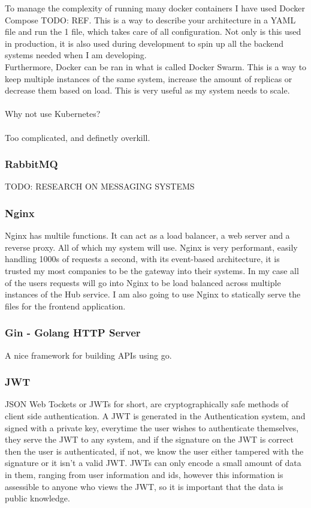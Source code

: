 \documentclass[titlepage]{article}
\begin{document}
To manage the complexity of running many docker containers I have used Docker Compose TODO: REF. This is a way to describe your architecture in a YAML file and run the 1 file, which takes care of all configuration. Not only is this used in production, it is also used during development to spin up all the backend systems needed when I am developing. \\

Furthermore, Docker can be ran in what is called Docker Swarm. This is a way to keep multiple instances of the same system, increase the amount of replicas or decrease them based on load. This is very useful as my system needs to scale. \\

\\
\noindent
{\large Why not use Kubernetes?} \\
\\
Too complicated, and definetly overkill.

\subsubsection{RabbitMQ}
TODO: RESEARCH ON MESSAGING SYSTEMS

\subsubsection{Nginx}
Nginx has multile functions. It can act as a load balancer, a web server and a reverse proxy. All of which my system will use. Nginx is very performant, easily handling 1000s of requests a second, with its event-based architecture, it is trusted my most companies to be the gateway into their systems. In my case all of the users requests will go into Nginx to be load balanced across multiple instances of the Hub service. I am also going to use Nginx to statically serve the files for the frontend application.

\subsubsection{Gin - Golang HTTP Server}
A nice framework for building APIs using go.

\subsubsection{JWT}
JSON Web Tockets or JWTs for short, are cryptographically safe methods of client side authentication. A JWT is generated in the Authentication system, and signed with a private key, everytime the user wishes to authenticate themselves, they serve the JWT to any system, and if the signature on the JWT is correct then the user is authenticated, if not, we know the user either tampered with the signature or it isn't a valid JWT. JWTs can only encode a small amount of data in them, ranging from user information and ids, however this information is assessible to anyone who views the JWT, so it is important that the data is public knowledge. \\
\end{document}
